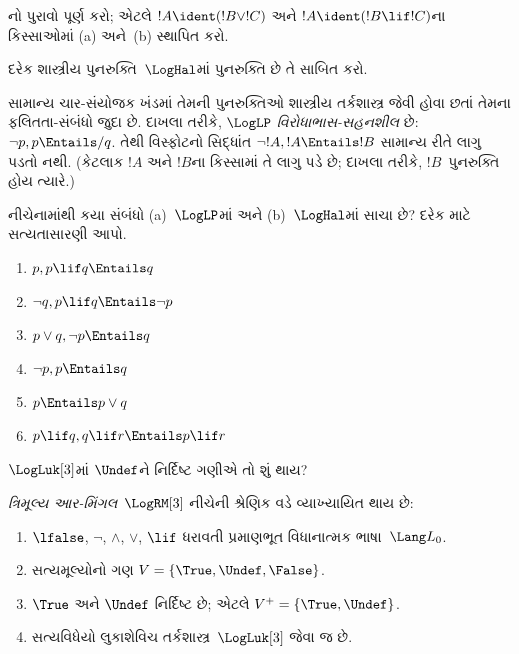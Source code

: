 \begin{prob}
  નો પુરાવો પૂર્ણ કરો; એટલે
  $!A \ident (!B \lor !C)$ અને $!A \ident (!B \lif !C)$ના
  કિસ્સાઓમાં (a) અને~(b) સ્થાપિત કરો.
\end{prob}

\begin{prob}
દરેક શાસ્ત્રીય પુનરુક્તિ~$\LogHal$માં પુનરુક્તિ છે તે સાબિત કરો.
\end{prob}

સામાન્ય ચાર-સંયોજક ખંડમાં તેમની પુનરુક્તિઓ શાસ્ત્રીય તર્કશાસ્ત્ર
જેવી હોવા છતાં તેમના ફલિતતા-સંબંધો જુદા છે. દાખલા તરીકે,
$\LogLP$ \emph{વિરોધાભાસ-સહનશીલ} છે: $\lnot p, p \Entails/ q$.
તેથી વિસ્ફોટનો સિદ્ધાંત $\lnot !A, !A \Entails !B$ સામાન્ય રીતે
લાગુ પડતો નથી. (કેટલાક $!A$ અને $!B$ના કિસ્સામાં તે લાગુ પડે છે;
દાખલા તરીકે, $!B$~પુનરુક્તિ હોય ત્યારે.)

\begin{prob}
  નીચેનામાંથી કયા સંબંધો (a)~$\LogLP$માં અને (b)~$\LogHal$માં
  સાચા છે? દરેક માટે સત્યતાસારણી આપો.
  \begin{enumerate}
    \item $p, p \lif q \Entails q$
    \item $\lnot q, p \lif q \Entails \lnot p$
    \item $p \lor q, \lnot p \Entails q$
    \item $\lnot p, p \Entails q$
    \item $p \Entails p \lor q$
    \item $p \lif q, q\lif r \Entails p \lif r$
  \end{enumerate}
\end{prob}

$\LogLuk[3]$માં $\Undef$ને નિર્દિષ્ટ ગણીએ તો શું થાય?

\begin{defn}
\emph{ત્રિમૂલ્ય આર-મિંગલ}~$\LogRM[3]$ નીચેની શ્રેણિક વડે વ્યાખ્યાયિત થાય છે:
  \begin{enumerate}
    \item $\lfalse$, $\lnot$, $\land$, $\lor$, $\lif$
    ધરાવતી પ્રમાણભૂત વિધાનાત્મક ભાષા~$\Lang L_0$.
    \item સત્યમૂલ્યોનો ગણ $V = \{\True, \Undef, \False\}$.
    \item $\True$ અને $\Undef$ નિર્દિષ્ટ છે; એટલે $V^+ = \{\True, \Undef\}$.
    \item સત્યવિધેયો લુકાશેવિચ તર્કશાસ્ત્ર~$\LogLuk[3]$ જેવા જ છે.
  \end{enumerate}
\end{defn}


